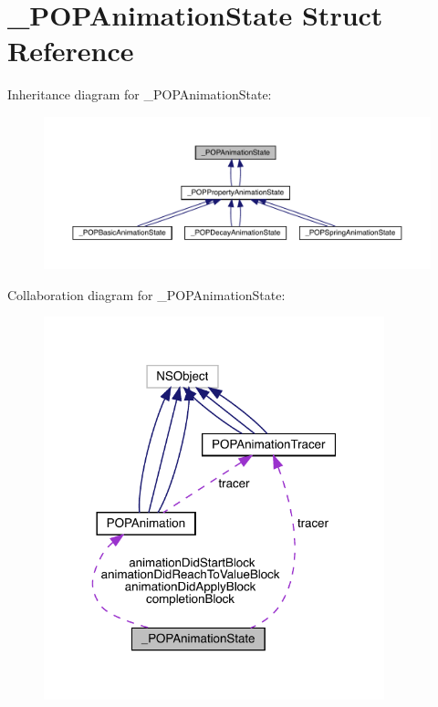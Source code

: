 \hypertarget{struct___p_o_p_animation_state}{}\section{\+\_\+\+P\+O\+P\+Animation\+State Struct Reference}
\label{struct___p_o_p_animation_state}


Inheritance diagram for \+\_\+\+P\+O\+P\+Animation\+State\+:\nopagebreak
\begin{figure}[H]
\begin{center}
\leavevmode
\includegraphics[width=350pt]{struct___p_o_p_animation_state__inherit__graph}
\end{center}
\end{figure}


Collaboration diagram for \+\_\+\+P\+O\+P\+Animation\+State\+:\nopagebreak
\begin{figure}[H]
\begin{center}
\leavevmode
\includegraphics[width=280pt]{struct___p_o_p_animation_state__coll__graph}
\end{center}
\end{figure}
